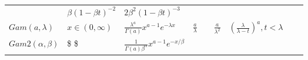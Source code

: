 \documentclass[]{tufte-book}
\begin{document}
\begin{longtable}[]{@{}lllllllll@{}}
\begin{minipage}[t]{0.08\columnwidth}
\end{minipage} & \begin{minipage}[t]{0.08\columnwidth}\raggedright
\(\beta(1-\beta t)^{-2}\)\strut
\end{minipage} & \begin{minipage}[t]{0.08\columnwidth}\raggedright
\(2\beta^2(1-\beta t)^{-3}\)\strut
\end{minipage}\tabularnewline
\begin{minipage}[t]{0.08\columnwidth}\raggedright
\(Gam(a, \lambda)\)\strut
\end{minipage} & \begin{minipage}[t]{0.08\columnwidth}\raggedright
\(x \in (0,\infty)\)\strut
\end{minipage} & \begin{minipage}[t]{0.08\columnwidth}\raggedright
\(\frac{\lambda^a}{\Gamma(a)}x^{a-1}e^{-\lambda x}\)\strut
\end{minipage} & \begin{minipage}[t]{0.08\columnwidth}\raggedright
\(\frac{a}{\lambda}\)\strut
\end{minipage} & \begin{minipage}[t]{0.08\columnwidth}\raggedright
\strut
\end{minipage} & \begin{minipage}[t]{0.08\columnwidth}\raggedright
\(\frac{a}{\lambda^2}\)\strut
\end{minipage} & \begin{minipage}[t]{0.08\columnwidth}\raggedright
\((\frac{\lambda}{\lambda - t})^a, t < \lambda\)\strut
\end{minipage} & \begin{minipage}[t]{0.08\columnwidth}\raggedright
\strut
\end{minipage} & \begin{minipage}[t]{0.08\columnwidth}\raggedright
\strut
\end{minipage}\tabularnewline
\begin{minipage}[t]{0.08\columnwidth}\raggedright
\(Gam2(\alpha,\beta)\)\strut
\end{minipage} & \begin{minipage}[t]{0.08\columnwidth}\raggedright
\$ \$\strut
\end{minipage} & \begin{minipage}[t]{0.08\columnwidth}\raggedright
\(\frac{1}{\Gamma(a)\beta^{\alpha}}x^{a-1}e^{-x/\beta}\)\strut
\end{minipage} & \begin{minipage}[t]{0.08\columnwidth}\raggedright

\end{minipage}
\end{longtable}
\end{document}
